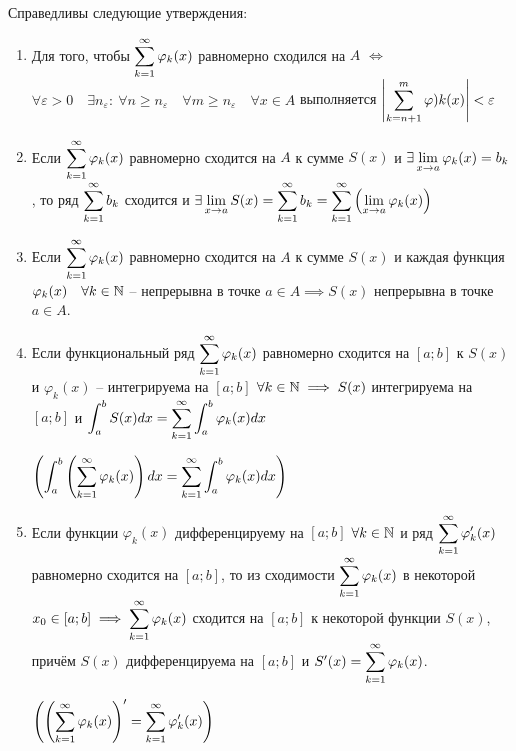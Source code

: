\begin{theorem}
    Справедливы следующие утверждения:

    \begin{enumerate}
        \item
            Для того, чтобы $\displaystyle\sum_{k=1}^\infty \varphi_k(x)$ равномерно сходился на $A$ $\iff$
            $\forall \varepsilon > 0 \quad \exists n_\varepsilon: \: 
            \forall n \geq n_\varepsilon \quad \forall m \geq n_\varepsilon \quad
            \forall x \in A$ выполняется 
            $\left| \displaystyle\sum_{k=n+1}^m \varphi)k(x) \right| < \varepsilon$
        
        \item
            Если $\displaystyle\sum_{k=1}^\infty \varphi_k(x)$ равномерно сходится на $A$ к сумме
            $S(x)$ и $\exists \displaystyle\lim_{x \to a} \varphi_k(x) = b_k$, то ряд
            $\displaystyle\sum_{k=1}^\infty b_k$ сходится и $\exists \displaystyle\lim_{x \to a} S(x) =
            \displaystyle\sum_{k=1}^\infty b_k = \displaystyle\sum_{k=1}^\infty \left( \displaystyle\lim_{x \to a} \varphi_k(x) \right)$

        \item 
            Если $\displaystyle\sum_{k=1}^\infty \varphi_k(x)$ равномерно сходится на $A$ к сумме
            $S(x)$ и каждая функция $\varphi_k(x) \quad \forall k \in \mathbb{N}$ --
            непрерывна в точке $a \in A \implies S(x)$ непрерывна в точке $a \in A$.
        
        \item
            Если функциональный ряд $\displaystyle\sum_{k=1}^\infty \varphi_k(x)$ равномерно сходится
            на $[a; b]$ к $S(x)$ и $\varphi_k(x)$ -- интегрируема на $[a; b]$
            $\forall k \in \mathbb{N} \implies S(x)$ интегрируема на $[a; b]$ и
            $\displaystyle\int_a^b S(x) dx = \displaystyle\sum_{k=1}^\infty \int_a^b \varphi_k(x) dx$

            $\left( \displaystyle\int_a^b \left(\displaystyle\sum_{k=1}^\infty \varphi_k(x)\right) dx = \displaystyle\sum_{k=1}^\infty \int_a^b \varphi_k(x) dx \right)$

        \item
            Если функции $\varphi_k(x)$ дифференцируему на $[a; b]$
            $\forall k \in \mathbb{N}$ и ряд $\displaystyle\sum_{k=1}^\infty \varphi'_k(x)$ равномерно
            сходится на $[a; b]$, то из сходимости $\displaystyle\sum_{k=1}^\infty \varphi_k(x)$ в
            некоторой $x_0 \in [a; b] \implies \displaystyle\sum_{k=1}^\infty \varphi_k(x)$ сходится
            на $[a; b]$ к некоторой функции $S(x)$, причём $S(x)$ 
            дифференцируема на $[a; b]$ и $S'(x) = \displaystyle\sum_{k=1}^\infty \varphi_k(x)$.

            $\left( \left( \displaystyle\sum_{k=1}^\infty \varphi_k(x) \right)' = \displaystyle\sum_{k=1}^\infty \varphi'_k(x) \right)$
    \end{enumerate}
\end{theorem}

